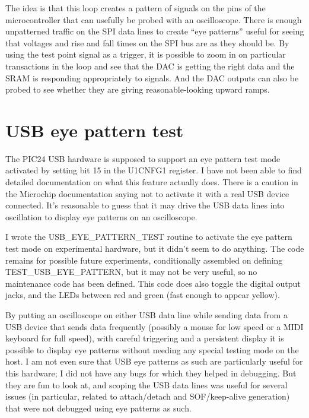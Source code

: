 The idea is that this loop creates a pattern of signals on the pins of the
microcontroller that can usefully be probed with an oscilloscope.  There is
enough unpatterned traffic on the SPI data lines to create ``eye patterns''
useful for seeing that voltages and rise and fall times on the SPI bus are
as they should be.  By using the test point signal as a trigger, it is
possible to zoom in on particular transactions in the loop and see that the
DAC is getting the right data and the SRAM is responding appropriately to
signals.  And the DAC outputs can also be probed to see whether they are
giving reasonable-looking upward ramps.

\section{USB eye pattern test}

The PIC24 USB hardware is supposed to support an eye pattern test mode
activated by setting bit 15 in the U1CNFG1 register.  I have not been able
to find detailed documentation on what this feature actually does.  There is
a caution in the Microchip documentation saying not to activate it with a
real USB device connected.  It's reasonable to guess that it may drive the
USB data lines into oscillation to display eye patterns on an oscilloscope.

I wrote the USB\_EYE\_PATTERN\_TEST routine to activate the eye pattern test
mode on experimental hardware, but it didn't seem to do anything.  The code
remains for possible future experiments, conditionally assembled on defining
TEST\_USB\_EYE\_PATTERN, but it may not be very useful, so no maintenance
code has been defined.  This code does also toggle the digital output jacks,
and the LEDs between red and green (fast enough to appear yellow).

By putting an oscilloscope on either USB data line while sending data from a
USB device that sends data frequently (possibly a mouse for low speed or a
MIDI keyboard for full speed), with careful triggering and a persistent
display it is possible to display eye patterns without needing any special
testing mode on the host.  I am not even sure that USB eye patterns as such
are particularly useful for this hardware; I did not have any bugs for which
they helped in debugging.  But they are fun to look at, and scoping the USB
data lines was useful for several issues (in particular, related to
attach/detach and SOF/keep-alive generation) that were not debugged using eye
patterns as such.
